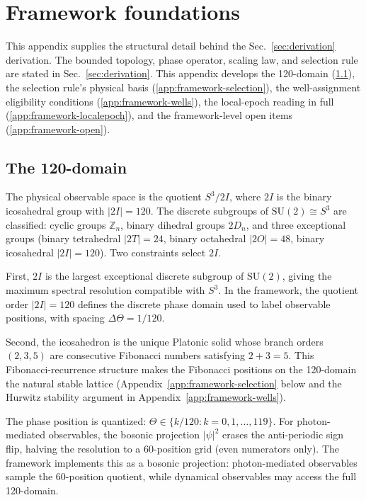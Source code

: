 \documentclass[
    aps,
    prd,
    reprint,
    superscriptaddress,
    nofootinbib,
    floatfix
]{revtex4-2}
\begin{document}
\appendix

\section{Framework foundations}
\label{app:framework}

This appendix supplies the structural detail behind the
Sec.~\ref{sec:derivation} derivation. The bounded topology, phase
operator, scaling law, and selection rule are stated in
Sec.~\ref{sec:derivation}. This appendix develops the 120-domain
(\ref{app:framework-domain}), the selection rule's physical basis
(\ref{app:framework-selection}), the well-assignment eligibility
conditions (\ref{app:framework-wells}), the local-epoch reading in
full (\ref{app:framework-localepoch}), and the framework-level open
items (\ref{app:framework-open}).

\subsection{The 120-domain}
\label{app:framework-domain}

The physical observable space is the quotient $S^3/2I$, where $2I$
is the binary icosahedral group with $|2I| = 120$. The discrete
subgroups of $\text{SU}(2) \cong S^3$ are classified: cyclic groups
$\mathbb{Z}_n$, binary dihedral groups $2D_n$, and three exceptional
groups (binary tetrahedral $|2T| = 24$, binary octahedral
$|2O| = 48$, binary icosahedral $|2I| = 120$). Two constraints
select $2I$.

First, $2I$ is the largest exceptional discrete subgroup of
$\text{SU}(2)$, giving the maximum spectral resolution compatible
with $S^3$. In the framework, the quotient order $|2I| = 120$
defines the discrete phase domain used to label observable
positions, with spacing $\Delta\Theta = 1/120$.

Second, the icosahedron is the unique Platonic solid whose branch
orders $(2, 3, 5)$ are consecutive Fibonacci numbers satisfying
$2 + 3 = 5$. This Fibonacci-recurrence structure makes the
Fibonacci positions on the 120-domain the natural stable lattice
(Appendix~\ref{app:framework-selection} below and the Hurwitz
stability argument in Appendix~\ref{app:framework-wells}).

The phase position is quantized:
$\Theta \in \{k/120 : k = 0, 1, \ldots, 119\}$. For photon-mediated
observables, the bosonic projection $|\psi|^2$ erases the
anti-periodic sign flip, halving the resolution to a 60-position
grid (even numerators only). The framework implements this as a
bosonic projection: photon-mediated observables sample the
60-position quotient, while dynamical observables may access the
full 120-domain.
\end{document}
